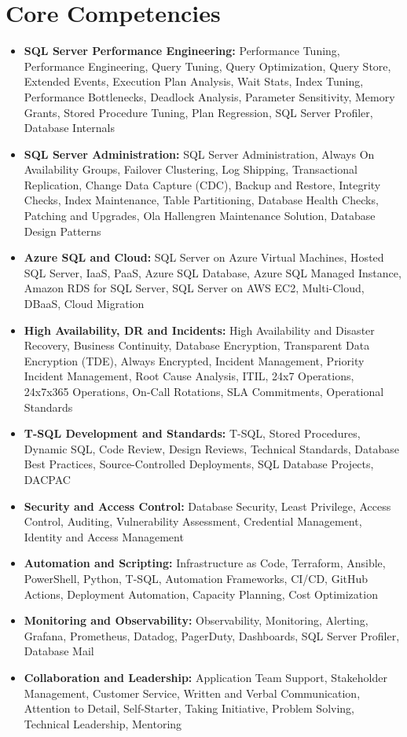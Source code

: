 \documentclass[10pt,a4paper]{article}
\begin{document}
\section{Core Competencies}
\begin{itemize}
  \item \textbf{SQL Server Performance Engineering:} Performance Tuning, Performance Engineering, Query Tuning, Query Optimization, Query Store, Extended Events, Execution Plan Analysis, Wait Stats, Index Tuning, Performance Bottlenecks, Deadlock Analysis, Parameter Sensitivity, Memory Grants, Stored Procedure Tuning, Plan Regression, SQL Server Profiler, Database Internals
  \item \textbf{SQL Server Administration:} SQL Server Administration, Always On Availability Groups, Failover Clustering, Log Shipping, Transactional Replication, Change Data Capture (CDC), Backup and Restore, Integrity Checks, Index Maintenance, Table Partitioning, Database Health Checks, Patching and Upgrades, Ola Hallengren Maintenance Solution, Database Design Patterns
  \item \textbf{Azure SQL and Cloud:} SQL Server on Azure Virtual Machines, Hosted SQL Server, IaaS, PaaS, Azure SQL Database, Azure SQL Managed Instance, Amazon RDS for SQL Server, SQL Server on AWS EC2, Multi-Cloud, DBaaS, Cloud Migration
  \item \textbf{High Availability, DR and Incidents:} High Availability and Disaster Recovery, Business Continuity, Database Encryption, Transparent Data Encryption (TDE), Always Encrypted, Incident Management, Priority Incident Management, Root Cause Analysis, ITIL, 24x7 Operations, 24x7x365 Operations, On-Call Rotations, SLA Commitments, Operational Standards
  \item \textbf{T-SQL Development and Standards:} T-SQL, Stored Procedures, Dynamic SQL, Code Review, Design Reviews, Technical Standards, Database Best Practices, Source-Controlled Deployments, SQL Database Projects, DACPAC
  \item \textbf{Security and Access Control:} Database Security, Least Privilege, Access Control, Auditing, Vulnerability Assessment, Credential Management, Identity and Access Management
  \item \textbf{Automation and Scripting:} Infrastructure as Code, Terraform, Ansible, PowerShell, Python, T-SQL, Automation Frameworks, CI/CD, GitHub Actions, Deployment Automation, Capacity Planning, Cost Optimization
  \item \textbf{Monitoring and Observability:} Observability, Monitoring, Alerting, Grafana, Prometheus, Datadog, PagerDuty, Dashboards, SQL Server Profiler, Database Mail
  \item \textbf{Collaboration and Leadership:} Application Team Support, Stakeholder Management, Customer Service, Written and Verbal Communication, Attention to Detail, Self-Starter, Taking Initiative, Problem Solving, Technical Leadership, Mentoring
\end{itemize}
\end{document}
